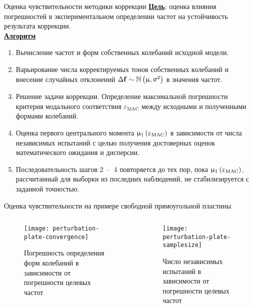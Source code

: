 \begin{frame}{Оценка чувствительности методики коррекции}
	\textbf{\underline{Цель}}: оценка влияния погрешностей в экспериментальном определении частот на устойчивость результата коррекции. \\
	\textbf{\underline{Алгоритм}}
	\begin{enumerate}
		\item Вычисление частот и форм собственных колебаний исходной модели.
		\item Варьирование числа корректируемых тонов собственных колебаний и внесение случайных отклонений $ \Delta \mathbf{f} \sim \mathbb{N} \left( \upmu, \upsigma ^ 2 \right) $ в значения частот. 
		\item Решение задачи коррекции. Определение максимальной погрешности критерия модального соответствия $ \varepsilon_{\mathrm{MAC}} $ между исходными и полученными формами колебаний.
		\item Оценка первого центрального момента $ \upmu_1\left( \upvarepsilon_{\mathrm{MAC}} \right) $ в зависимости от числа независимых испытаний с целью получения достоверных оценок математического ожидания и дисперсии. 
		\item Последовательность шагов 2~--~4 повторяется до тех пор, пока $ \upmu_1\left( \upvarepsilon_{\mathrm{MAC}} \right) $, рассчитанный для выборки из последних наблюдений, не стабилизируется с заданной точностью.
	\end{enumerate}
\end{frame}

\begin{frame}{Оценка чувствительности на примере свободной прямоугольной пластины}
	\begin{center}	
		\begin{columns}
			\begin{column}{0.5\textwidth}
				\centering
				\begin{figure}
					\texttt{[image: perturbation-plate-convergence]}
					\caption{Погрешность определения форм колебаний в зависимости от погрешности целевых частот}
				\end{figure}
			\end{column}
			\begin{column}{0.5\textwidth}
				\centering
				\vspace{-0.9em}
				\begin{figure}
					\texttt{[image: perturbation-plate-samplesize]}
					\caption{Число независимых испытаний в зависимости от погрешности целевых частот}
				\end{figure}
			\end{column}
		\end{columns}
	\end{center}
\end{frame}

